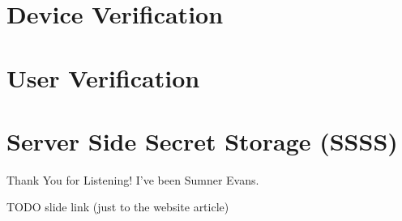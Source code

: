 \documentclass{beeper}
\begin{document}
\section{Device Verification}

\section{User Verification}

\section{Server Side Secret Storage (SSSS)}

\begin{frame}{Thank You for Listening!}
    I've been Sumner Evans.

    TODO slide link (just to the website article)
\end{frame}
\end{document}
